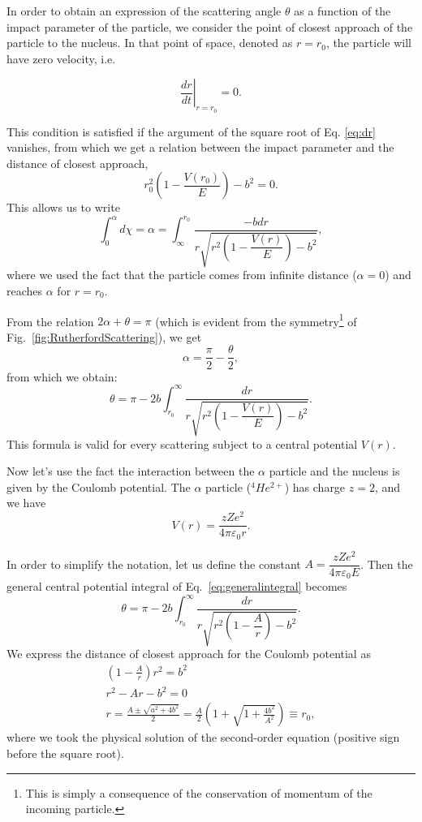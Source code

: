 In order to obtain an expression of the scattering angle $\theta$ as a function of the impact parameter of the particle, we consider the point of closest approach of the particle to the nucleus. In that point of space, denoted as $r=r_0$, the particle will have zero velocity, i.e.

\[
\left.\frac{dr}{dt}\right|_{r=r_0} = 0.
\]

This condition is satisfied if the argument of the square root of Eq. \eqref{eq:dr} vanishes, from which we get a relation between the impact parameter and the distance of closest approach,
\[r_0^2 \left ( 1 -\frac{V(r_0)}{E} \right ) - b^2 = 0.\]
This allows us to write
\[ \int_0^{\alpha} d\chi = \alpha = \int_{\infty}^{r_0} \frac{-b dr}{r \sqrt{r^2 \left (1-\dfrac{V(r)}{E} \right ) - b^2}},\]
where we used the fact that the particle comes from infinite distance ($\alpha=0$) and reaches $\alpha$ for $r=r_0$.

From the relation $2\alpha+\theta = \pi$ (which is evident from the symmetry\footnote{This is simply a consequence of the conservation of momentum of the incoming particle.} of  Fig.~\ref{fig:RutherfordScattering}), we get
\[\alpha = \frac{\pi}{2} - \frac{\theta}{2},\]
from which we obtain:
\begin{equation}
\label{eq:generalintegral}
\theta = \pi - 2b \int_{r_0}^{\infty} \frac{dr}{r \sqrt{r^2 \left (1-\dfrac{V(r)}{E} \right ) - b^2}}.
\end{equation}
This formula is valid for every scattering subject to a central potential $V(r)$.

Now let's use the fact the interaction between the $\alpha$ particle and the nucleus is given by the Coulomb potential. The $\alpha$ particle ($^4 He^{2+}$) has charge $z=2$, and we have
\[ V(r) = \frac{zZe^2}{4 \pi \varepsilon_0 r}.\]

In order to simplify the notation, let us define the constant $A = \dfrac{zZe^2}{4 \pi \varepsilon_0 E}$. Then the general central potential integral of Eq.~\eqref{eq:generalintegral} becomes
\begin{equation}
    \label{eq:coulombintegral}
    \theta = \pi - 2b \int_{r_0}^{\infty} \frac{dr}{r \sqrt{r^2 \left (1-\dfrac{A}{r} \right ) - b^2}}.
\end{equation}
We express the distance of closest approach for the Coulomb potential as
\begin{align}
    \left(1-\frac{A}{r}\right)r^2 = b^2\\
    r^2-Ar-b^2=0\\
    r=\frac{A\pm\sqrt{a^2+4b^2}}{2}=\frac{A}{2}\left(1 + \sqrt{1 + \frac{4b^2}{A^2}}\right)\equiv r_0,\label{eq:rutherfordclosestapproach}
\end{align}
where we took the physical solution of the second-order equation (positive sign before the square root).

